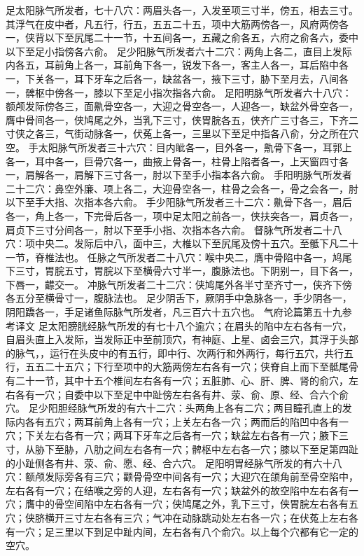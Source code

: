 \documentclass[a4paper,12pt,UTF8,twoside]{ctexbook}
\begin{document}
足太阳脉气所发者，七十八穴：两眉头各一，入发至项三寸半，傍五，相去三寸。其浮气在皮中者，凡五行，行五，五五二十五，项中大筋两傍各一，风府两傍各一，侠背以下至尻尾二十一节，十五间各一，五藏之俞各五，六府之俞各六，委中以下至足小指傍各六俞。
足少阳脉气所发者六十二穴：两角上各二，直目上发际内各五，耳前角上各一，耳前角下各一，锐发下各一，客主人各一，耳后陷中各一，下关各一，耳下牙车之后各一，缺盆各一，掖下三寸，胁下至月去，八间各一，髀枢中傍各一，膝以下至足小指次指各六俞。
足阳明脉气所发者六十八穴：额颅发际傍各三，面鼽骨空各一，大迎之骨空各一，人迎各一，缺盆外骨空各一，膺中骨间各一，侠鸠尾之外，当乳下三寸，侠胃脘各五，侠齐广三寸各三，下齐二寸侠之各三，气街动脉各一，伏菟上各一，三里以下至足中指各八俞，分之所在穴空。
手太阳脉气所发者三十六穴：目内眦各一，目外各一，鼽骨下各一，耳郭上各一，耳中各一，巨骨穴各一，曲掖上骨各一，柱骨上陷者各一，上天窗四寸各一，肩解各一，肩解下三寸各一，肘以下至手小指本各六俞。
手阳明脉气所发者二十二穴：鼻空外廉、项上各二，大迎骨空各一，柱骨之会各一，骨之会各一，肘以下至手大指、次指本各六俞。
手少阳脉气所发者三十二穴：鼽骨下各一，眉后各一，角上各一，下完骨后各一，项中足太阳之前各一，侠扶突各一，肩贞各一，肩贞下三寸分间各一，肘以下至手小指、次指本各六俞。
督脉气所发者二十八穴：项中央二。发际后中八，面中三，大椎以下至尻尾及傍十五穴。至骶下凡二十一节，脊椎法也。
任脉之气所发者二十八穴：喉中央二，膺中骨陷中各一，鸠尾下三寸，胃脘五寸，胃脘以下至横骨六寸半一，腹脉法也。下阴别一，目下各一，下唇一，齽交一。
冲脉气所发者二十二穴：侠鸠尾外各半寸至齐寸一，侠齐下傍各五分至横骨寸一，腹脉法也。
足少阴舌下，厥阴手中急脉各一，手少阴各一，阴阳蹻各一，手足诸鱼际脉气所发者，凡三百六十五穴也。
气府论篇第五十九参考译文
足太阳膀胱经脉气所发的有七十八个逾穴；在眉头的陷中左右各有一穴，自眉头直上入发际，当发际正中至前顶穴，有神庭、上星、卤会三穴，其浮于头部的脉气，，运行在头皮中的有五行，即中行、次两行和外两行，每行五穴，共行五行，五五二十五穴；下行至项中的大筋两傍左右各有一穴；侠脊自上而下至骶尾骨有二十一节，其中十五个椎间左右各有一穴；五脏肺、心、肝、脾、肾的俞穴，左右各有一穴；自委中以下至足中中趾傍左右各有井、荥、俞、原、经、合六个俞穴。
足少阳胆经脉气所发的有六十二穴：头两角上各有二穴；两目瞳孔直上的发际内各有五穴；两耳前角上各有一穴；上关左右各一穴；两而后的陷凹中各有一穴；下关左右各有一穴；两耳下牙车之后各有一穴；缺盆左右各有一穴；腋下三寸，从胁下至胁，八肋之间左右各有一穴；髀枢中左右各一穴；膝以下至足第四趾的小趾侧各有井、荥、俞、愿、经、合六穴。
足阳明胃经脉气所发的有六十八穴：额颅发际旁各有三穴；颧骨骨空中间各有一穴；大迎穴在颌角前至骨空陷中，左右各有一穴；在结喉之旁的人迎，左右各有一穴；缺盆外的故空陷中左右各有一穴；膺中的骨空间陷中左右各有一穴；侠鸠尾之外，乳下三寸，侠胃脘左右各有五穴；侠脐横开三寸左右各有三穴；气冲在动脉跳动处左右各一穴；在伏菟上左右各有一穴；足三里以下到足中趾内间，左右各有八个俞穴。以上每个穴都有它一定的空穴。
\end{document}
